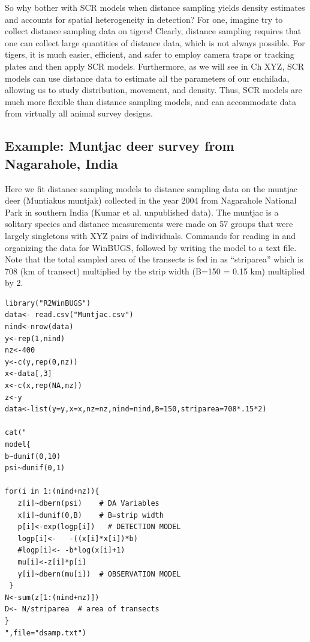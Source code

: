So why bother with SCR models when distance sampling yields density estimates and accounts for spatial  heterogeneity in detection? For one, imagine try to collect distance sampling data on tigers! Clearly, distance sampling requires that one can collect large quantities of distance data, which is not always possible. For tigers, it is much easier, efficient, and safer to employ camera traps or tracking plates and then apply SCR models. Furthermore, as we will see in Ch XYZ, SCR models can use distance data to estimate all the parameters of our enchilada, allowing us to study distribution, movement, and density. Thus, SCR models are much more flexible than distance sampling models, and can accommodate data from virtually all animal survey designs. 


\subsection{Example: Muntjac deer survey from Nagarahole, India }
Here we fit distance sampling models to distance sampling data on the muntjac deer (Muntiakus muntjak) collected in the year 2004 from Nagarahole National Park in southern India \citep{kumar_etal:XXXX}(Kumar et al. unpublished data). The muntjac is a solitary species and distance measurements were made on 57 groups that were largely singletons with XYZ pairs of individuals.  Commands for reading in and organizing the data for WinBUGS, followed by writing the model to a text file. Note that the total sampled area of the transects is fed in as ``striparea'' which is 708 (km of transect) multiplied by the strip width (B=150 = 0.15 km) multiplied by 2.
\begin{verbatim}
library("R2WinBUGS")
data<- read.csv("Muntjac.csv")
nind<-nrow(data)
y<-rep(1,nind)
nz<-400
y<-c(y,rep(0,nz))
x<-data[,3]
x<-c(x,rep(NA,nz))
z<-y
data<-list(y=y,x=x,nz=nz,nind=nind,B=150,striparea=708*.15*2)

cat("
model{
b~dunif(0,10)
psi~dunif(0,1)

for(i in 1:(nind+nz)){
   z[i]~dbern(psi)    # DA Variables
   x[i]~dunif(0,B)    # B=strip width
   p[i]<-exp(logp[i])   # DETECTION MODEL
   logp[i]<-   -((x[i]*x[i])*b)
   #logp[i]<- -b*log(x[i]+1)
   mu[i]<-z[i]*p[i]
   y[i]~dbern(mu[i])  # OBSERVATION MODEL
 }
N<-sum(z[1:(nind+nz)])
D<- N/striparea  # area of transects
}
",file="dsamp.txt")
\end{verbatim}

